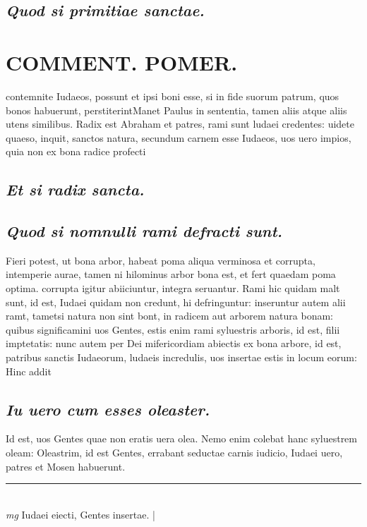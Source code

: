 \documentclass{article}
\begin{document}
\begin{pages}
\subsection*{\textit{Quod si primitiae sanctae. }}\pstart  \pend
\section*{COMMENT. POMER.  }\pstart contemnite Iudaeos, possunt et ipsi boni esse, si in fide suorum patrum, quos bonos habuerunt, perstiterint\pend\pstart Manet Paulus in sententia, tamen aliis atque aliis utens similibus. Radix est Abraham et patres, rami sunt ludaei credentes: uidete quaeso, inquit, sanctos natura, secundum carnem esse Iudaeos, uos uero impios, quia non ex bona radice profecti\pend
{}
{}
\subsection*{\textit{Et si radix sancta. }}
{}
\subsection*{\textit{Quod si nomnulli rami defracti sunt. }}\pstart Fieri potest, ut bona arbor, habeat poma aliqua verminosa et corrupta, intemperie aurae, tamen ni hilominus arbor bona est, et fert quaedam poma optima.  corrupta igitur abiiciuntur, integra seruantur. Rami hic quidam malt sunt, id est, Iudaei quidam non credunt, hi defringuntur: inseruntur autem alii ramt, tametsi natura non sint bont, in radicem aut arborem natura bonam: quibus significamini uos Gentes, estis enim rami syluestris arboris, id est, filii imptetatis: nunc autem per Dei mifericordiam abiectis ex bona arbore, id est, patribus sanctis Iudaeorum, ludaeis incredulis, uos insertae estis in locum eorum: Hinc addit  \pend
{}
{}
\subsection*{\textit{Iu uero cum esses oleaster. }}\pstart Id est, uos Gentes quae non eratis uera olea. Nemo enim colebat hanc syluestrem oleam: Oleastrim, id est Gentes, errabant seductae carnis iudicio, Iudaei uero, patres et Mosen habuerunt.  \pend
\vspace{0.5cm}\noindent
\vspace{0.2cm}\rule{1cm}{0.2pt}\\ 
\hspace{0.2cm}\textit{mg}
\footnotesize Iudaei eiecti, Gentes insertae.  
\normalsize| 

\end{pages}
\end{document}
